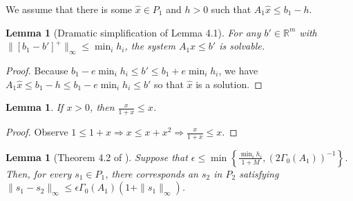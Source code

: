 \documentclass{article}
\newenvironment{comment}
  {\par\medskip
   \color{red}%
   \begin{framed}
   \textbf{Comment: }\ignorespaces}
 {\end{framed}
  \medskip}
\newtheorem{lemma}[theorem]{Lemma}
\theoremstyle{case}
\numberwithin{theorem}{subsection}
\newcommand{\huff}{{\Gamma_0}}
\newcommand{\Rm}{\mathbb R^m}
\begin{document}
We assume that there is some $\hat x \in P_1$ and $h > 0$ such that $A_1 \hat x \le b_1 - h$.



\begin{lemma}[Dramatic simplification of Lemma 4.1]
\label{4_1}
For any $b' \in \Rm$ with $\|\left[b_1 - b'\right]^+\|_{\infty} \le \min_i h_i$, the system $A_1x \le b'$ is solvable.
\end{lemma}

\begin{proof}
Because $b_1 - e \min_i h_i \le b' \le b_1 + e \min_i h_i$, we have $A_1\hat x\le b_1 - h\le b_1 - e \min_i h_i \le b'$ so that $\hat x$ is a solution.
\end{proof}


\begin{lemma}
\label{simple_bound}
If $x > 0$, then $\frac {x}{1+x} \le x$.
\end{lemma}
\begin{proof}
Observe $1 \le 1 + x\Longrightarrow x \le x + x^2 \Longrightarrow \frac {x}{1+x} \le x$.
\end{proof}




\begin{lemma}[Theorem 4.2 of \cite{dummy:perturbations}]
\label{4_2}
Suppose that $\epsilon\le \min\left\{\frac{\min_i h_i}{1 + M},\left(2\huff(A_1)\right)^{-1}\right\}$.
Then, for every $s_1 \in P_1$,
there corresponds an $s_2$ in $P_2$ satisfying 
$\|s_1 - s_2\|_{\infty}\le \epsilon\huff(A_1)\left(1 + \|s_1\|_{\infty}\right)$.
\end{lemma}
\end{document}
